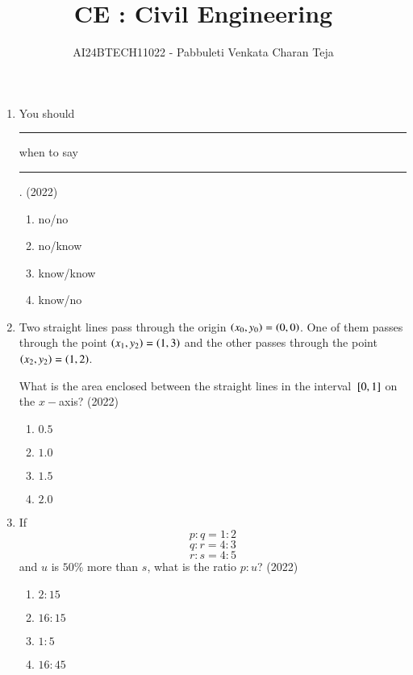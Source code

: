 \documentclass[journal]{IEEEtran}
\begin{document}

\vspace{3cm}

\title{CE : Civil Engineering}
\author{AI24BTECH11022 - Pabbuleti Venkata Charan Teja}
\maketitle

\renewcommand{\thefigure}{\theenumi}
\renewcommand{\thetable}{\theenumi}


\begin{enumerate}
\item You should \rule{1cm}{0.15mm} when to say \rule{1cm}{0.15mm}. \hfill(2022)
\begin{multicols}{2}
\begin{enumerate}
\item no/no
\item no/know
\item know/know
\item know/no
\end{enumerate}
\end{multicols}


\item Two straight lines pass through the origin $\left(x_{0},y_{0}\right)=\left(0,0\right)$. One of them passes through the point $\left(x_{1},y_{2}\right)=\left(1,3\right)$ and the other passes through the point $\left(x_{2},y_{2}\right)=\left(1,2\right)$.

What is the area enclosed between the straight lines in the interval ${}\left[0,1\right]$ on the $x-$axis? \hfill(2022)
\begin{multicols}{2}
\begin{enumerate}
\item $0.5$
\item $1.0$
\item $1.5$
\item $2.0$
\end{enumerate}
\end{multicols}


\item If $$p:q=1:2$$ $$q:r=4:3$$ $$r:s=4:5$$ and $u$ is $50\%$ more than $s$, what is the ratio $p:u$? \hfill(2022)
\begin{multicols}{2}
\begin{enumerate}
\item $2:15$
\item $16:15$
\item $1:5$
\item $16:45$
\end{enumerate}
\end{multicols}



\end{enumerate}
\end{document}
